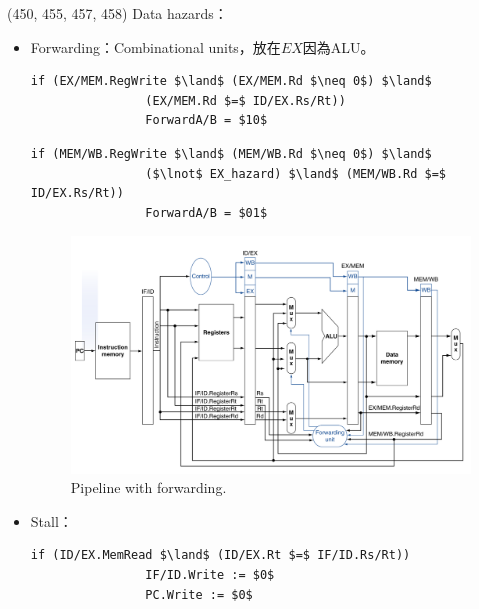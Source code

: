 \item \begin{theorem}{(450, 455, 457, 458)} Data hazards：\begin{itemize}
        \item Forwarding：Combinational units，放在$EX$因為ALU。
        \begin{lstlisting}[caption={EX hazard.}, captionpos=b, mathescape=true, language={[x86masm]Assembler}, autogobble=true]
            if (EX/MEM.RegWrite $\land$ (EX/MEM.Rd $\neq 0$) $\land$ 
                (EX/MEM.Rd $=$ ID/EX.Rs/Rt))
                ForwardA/B = $10$
        \end{lstlisting}
        \begin{lstlisting}[caption={MEM hazard.}, captionpos=b, mathescape=true, language={[x86masm]Assembler}, autogobble=true]
            if (MEM/WB.RegWrite $\land$ (MEM/WB.Rd $\neq 0$) $\land$ 
                ($\lnot$ EX_hazard) $\land$ (MEM/WB.Rd $=$ ID/EX.Rs/Rt))
                ForwardA/B = $01$
        \end{lstlisting}
        \begin{figure}[H]
            \centering
            \includegraphics[scale=0.3]{img/pipeline-forward.png}
            \caption{Pipeline with forwarding.}
            \label{img:pipeline-forward}
        \end{figure}
        \item Stall：\code{}
        \begin{lstlisting}[caption={Stall.}, captionpos=b, mathescape=true, language={[x86masm]Assembler}, autogobble=true]
            if (ID/EX.MemRead $\land$ (ID/EX.Rt $=$ IF/ID.Rs/Rt))
                IF/ID.Write := $0$
                PC.Write := $0$
        \end{lstlisting}
        \begin{figure}[H]

\end{figure}
\end{itemize}
\end{theorem}
